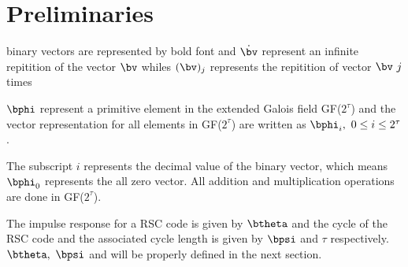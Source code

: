 \section{Preliminaries}
binary vectors are represented by bold font and $\dot{\bv}$ represent an infinite repitition of the vector $\bv$ whiles $(\bv)_j$ represents the repitition of vector $\bv~j$ times   

$\bphi$ represent a primitive element in the extended Galois field GF($2^{\tau}$) and the vector representation for all elements in GF($2^{\tau}$) are written as $\bphi_i,~0 \leq i \leq 2^{\tau}$. 

The subscript $i$ represents the decimal value of the binary vector, which means $\bphi_0$ represents the all zero vector. All addition and multiplication operations are done in GF($2^{\tau}$).

The impulse response for a RSC code is given by $\btheta$ and the cycle of the RSC code and the associated cycle length is given by $\bpsi$ and $\tau$ respectively. $\btheta,~\bpsi$ and will be properly defined in the next section.